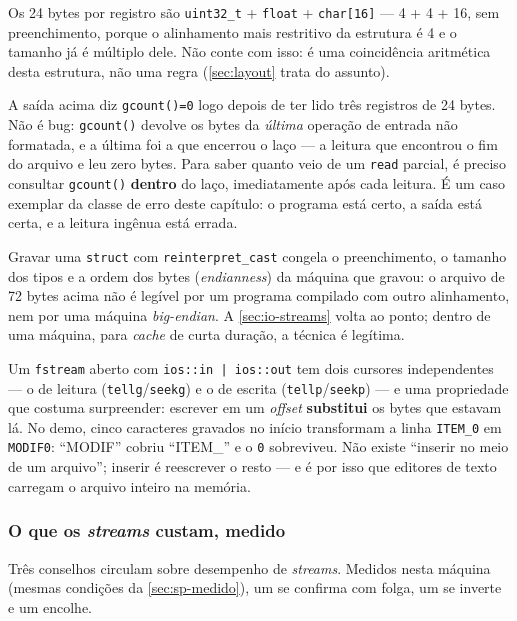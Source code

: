 Os 24 bytes por registro são \texttt{uint32\_t} + \texttt{float} +
\texttt{char[16]} --- 4 + 4 + 16, sem preenchimento, porque o alinhamento mais
restritivo da estrutura é 4 e o tamanho já é múltiplo dele. Não conte com isso:
é uma coincidência aritmética desta estrutura, não uma regra
(\cref{sec:layout} trata do assunto).

\begin{armadilha}
A saída acima diz \texttt{gcount()=0} logo depois de ter lido três registros de
24 bytes. Não é bug: \texttt{gcount()} devolve os bytes da \emph{última}
operação de entrada não formatada, e a última foi a que encerrou o laço --- a
leitura que encontrou o fim do arquivo e leu zero bytes. Para saber quanto veio
de um \texttt{read} parcial, é preciso consultar \texttt{gcount()}
\textbf{dentro} do laço, imediatamente após cada leitura. É um caso exemplar da
classe de erro deste capítulo: o programa está certo, a saída está certa, e a
leitura ingênua está errada.
\end{armadilha}

Gravar uma \texttt{struct} com \texttt{reinterpret\_cast} congela o
preenchimento, o tamanho dos tipos e a ordem dos bytes (\emph{endianness}) da
máquina que gravou: o arquivo de 72 bytes acima não é legível por um programa
compilado com outro alinhamento, nem por uma máquina \emph{big-endian}. A
\cref{sec:io-streams} volta ao ponto; dentro de uma máquina, para \emph{cache}
de curta duração, a técnica é legítima.

Um \texttt{fstream} aberto com \texttt{ios::in | ios::out} tem dois cursores
independentes --- o de leitura (\texttt{tellg}/\texttt{seekg}) e o de escrita
(\texttt{tellp}/\texttt{seekp}) --- e uma propriedade que costuma surpreender:
escrever em um \emph{offset} \textbf{substitui} os bytes que estavam lá. No
demo, cinco caracteres gravados no início transformam a linha
\texttt{ITEM\_0} em \texttt{MODIF0}: ``MODIF'' cobriu ``ITEM\_'' e o
\texttt{0} sobreviveu. Não existe ``inserir no meio de um arquivo''; inserir é
reescrever o resto --- e é por isso que editores de texto carregam o arquivo
inteiro na memória.

\subsubsection{O que os \emph{streams} custam, medido}

Três conselhos circulam sobre desempenho de \emph{streams}. Medidos nesta
máquina (mesmas condições da \cref{sec:sp-medido}), um se confirma com folga,
um se inverte e um encolhe.

